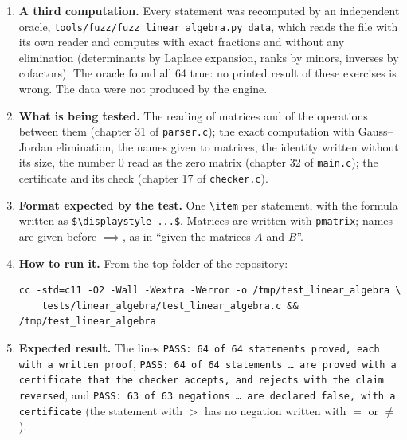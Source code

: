 \documentclass[11pt,a4paper]{article}
\begin{document}
\begin{enumerate}
\item \textbf{A third computation.} Every statement was recomputed by an independent oracle, \texttt{tools/fuzz/fuzz\_linear\_algebra.py data}, which reads the file with its own reader and computes with exact fractions and without any elimination (determinants by Laplace expansion, ranks by minors, inverses by cofactors). The oracle found all 64 true: no printed result of these exercises is wrong. The data were not produced by the engine.

\item \textbf{What is being tested.} The reading of matrices and of the operations between them (chapter 31 of \texttt{parser.c}); the exact computation with Gauss--Jordan elimination, the names given to matrices, the identity written without its size, the number $0$ read as the zero matrix (chapter 32 of \texttt{main.c}); the certificate and its check (chapter 17 of \texttt{checker.c}).

\item \textbf{Format expected by the test.} One \texttt{\textbackslash item} per statement, with the formula written as \texttt{\$\textbackslash displaystyle ...\$}. Matrices are written with \texttt{pmatrix}; names are given before $\implies$, as in ``given the matrices $A$ and $B$''.

\item \textbf{How to run it.} From the top folder of the repository:
\begin{verbatim}
cc -std=c11 -O2 -Wall -Wextra -Werror -o /tmp/test_linear_algebra \
    tests/linear_algebra/test_linear_algebra.c && /tmp/test_linear_algebra
\end{verbatim}

\item \textbf{Expected result.} The lines \texttt{PASS: 64 of 64 statements proved, each with a written proof}, \texttt{PASS: 64 of 64 statements \dots{} are proved with a certificate that the checker accepts, and rejects with the claim reversed}, and \texttt{PASS: 63 of 63 negations \dots{} are declared false, with a certificate} (the statement with $>$ has no negation written with $=$ or $\neq$).
\end{enumerate}
\end{document}
